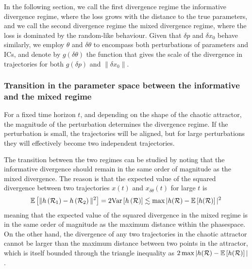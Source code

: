 In the following section, we call the first divergence regime the informative divergence regime, where the loss grows with the distance to the true parameters, and we call the second divergence regime the mixed divergence regime, where the loss is dominated by the random-like behaviour.
% 
Given that $\delta p$ and $\delta x_0$ behave similarly, we employ $\theta$ and $\delta \theta$ to encompass both perturbations of parameters and ICs, and denote by $g(\delta\theta)$ the function that gives the scale of the divergence in trajectories for both $g(\delta p)$ and $\|\delta x_0\|$.

\subsubsection{Transition in the parameter space between the informative and the mixed regime}
% 
For a fixed time horizon $t$, and depending on the shape of the chaotic attractor, the magnitude of the perturbation determines the divergence regime. If the perturbation is small, the trajectories will be aligned, but for large perturbations they will effectively become two independent trajectories.

The transition between the two regimes can be studied by noting that the informative divergence should remain in the same order of magnitude as the mixed divergence. The reason is that the expected value of the squared divergence between two trajectories $x(t)$ and $x_{\delta \theta}(t)$ for large $t$ is
\begin{equation}\label{eqSI:ordermagnitude}
    {\ensuremath{\mathbb{E}}}\left[\|h\left(\mathcal{R}_1\right) - h\left(\mathcal{R}_2\right) \|^2\right] = 2{\operatorname{Var}}\left[h\left(\mathcal{R}\right)\right] \lesssim \max|h(\mathcal{R}) - {\mathbb{E}}\left[h(\mathcal{R})\right]|^2
\end{equation}
meaning that the expected value of the squared divergence in the mixed regime is in the same order of magnitude as the maximum distance within the phasespace. 
% 
On the other hand, the divergence of any two trajectories in the chaotic attractor cannot be larger than the maximum distance between two points in the attractor, which is itself bounded through the triangle inequality as $2\max|h(\mathcal{R}) - {\mathbb{E}}\left[h(\mathcal{R})\right]|$. 

